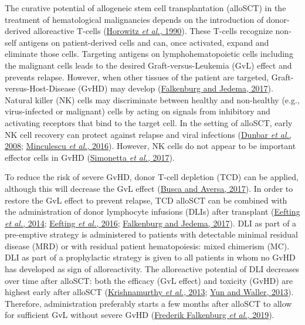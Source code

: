 \documentclass[
  letterpaper,
  DIV=11,
  numbers=noendperiod]{scrreprt}
\begin{document}
The curative potential of allogeneic stem cell transplantation (alloSCT)
in the treatment of hematological malignancies depends on the
introduction of donor-derived alloreactive T-cells
(\protect\hyperlink{ref-horowitzGraftversusleukemiaReactionsBone1990}{Horowitz
\emph{et al.}, 1990}). These T-cells recognize non-self antigens on
patient-derived cells and can, once activated, expand and eliminate
those cells. Targeting antigens on lymphohematopoietic cells including
the malignant cells leads to the desired Graft-versus-Leukemia (GvL)
effect and prevents relapse. However, when other tissues of the patient
are targeted, Graft-versus-Host-Disease (GvHD) may develop
(\protect\hyperlink{ref-falkenburgGraftTumorEffects2017}{Falkenburg and
Jedema, 2017}). Natural killer (NK) cells may discriminate between
healthy and non-healthy (e.g., virus-infected or malignant) cells by
acting on signals from inhibitory and activating receptors that bind to
the target cell. In the setting of alloSCT, early NK cell recovery can
protect against relapse and viral infections
(\protect\hyperlink{ref-dunbarRelationshipCirculatingNatural2008}{Dunbar
\emph{et al.}, 2008};
\protect\hyperlink{ref-minculescuEarlyNaturalKiller2016}{Minculescu
\emph{et al.}, 2016}). However, NK cells do not appear to be important
effector cells in GvHD
(\protect\hyperlink{ref-simonettaNaturalKillerCells2017}{Simonetta
\emph{et al.}, 2017}).

To reduce the risk of severe GvHD, donor T-cell depletion (TCD) can be
applied, although this will decrease the GvL effect
(\protect\hyperlink{ref-buscaInvivoExvivoCell2017}{Busca and Aversa,
2017}). In order to restore the GvL effect to prevent relapse, TCD
alloSCT can be combined with the administration of donor lymphocyte
infusions (DLIs) after transplant
(\protect\hyperlink{ref-eeftingMyeloablativeCelldepletedAlloSCT2014}{Eefting
\emph{et al.}, 2014};
\protect\hyperlink{ref-eeftingMultistateAnalysisIllustrates2016}{Eefting
\emph{et al.}, 2016};
\protect\hyperlink{ref-falkenburgGraftTumorEffects2017}{Falkenburg and
Jedema, 2017}). DLI as part of a pre-emptive strategy is administered to
patients with detectable minimal residual disease (MRD) or with residual
patient hematopoiesis: mixed chimerism (MC). DLI as part of a
prophylactic strategy is given to all patients in whom no GvHD has
developed as sign of alloreactivity. The alloreactive potential of DLI
decreases over time after alloSCT: both the efficacy (GvL effect) and
toxicity (GvHD) are highest early after alloSCT
(\protect\hyperlink{ref-krishnamurthyOutcomeDonorLymphocyte2013}{Krishnamurthy
\emph{et al.}, 2013};
\protect\hyperlink{ref-yunFindingSweetSpot2013}{Yun and Waller, 2013}).
Therefore, administration preferably starts a few months after alloSCT
to allow for sufficient GvL without severe GvHD
(\protect\hyperlink{ref-frederik2019delayed}{Frederik Falkenburg
\emph{et al.}, 2019}).
\end{document}
